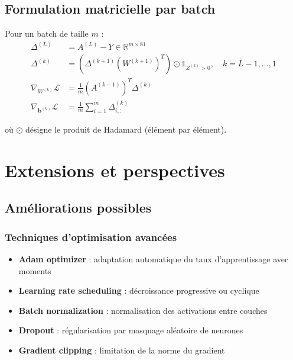 \documentclass[12pt,a4paper]{report}
\numberwithin{equation}{section}
\begin{document}
\section{Formulation matricielle par batch}

\begin{important}
Pour un batch de taille $m$ :
\begin{align}
\Delta^{(L)} &= A^{(L)} - Y \in \mathbb{R}^{m \times 81}\\
\Delta^{(k)} &= \left(\Delta^{(k+1)} (W^{(k+1)})^T\right) \odot \mathbb{1}_{Z^{(k)} > 0}, \quad k = L-1, \ldots, 1\\
\nabla_{W^{(k)}} \mathcal{L} &= \frac{1}{m} (A^{(k-1)})^T \Delta^{(k)}\\
\nabla_{\mathbf{b}^{(k)}} \mathcal{L} &= \frac{1}{m} \sum_{i=1}^{m} \Delta^{(k)}_{i,:}
\end{align}

où $\odot$ désigne le produit de Hadamard (élément par élément).
\end{important}

\chapter{Extensions et perspectives}

\section{Améliorations possibles}

\subsection{Techniques d'optimisation avancées}
\begin{itemize}
  \item \textbf{Adam optimizer} : adaptation automatique du taux d'apprentissage avec moments
  \item \textbf{Learning rate scheduling} : décroissance progressive ou cyclique
  \item \textbf{Batch normalization} : normalisation des activations entre couches
  \item \textbf{Dropout} : régularisation par masquage aléatoire de neurones
  \item \textbf{Gradient clipping} : limitation de la norme du gradient
\end{itemize}
\end{document}
